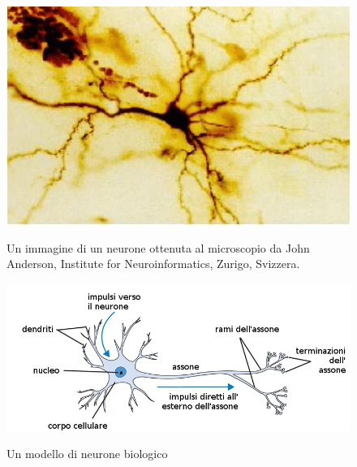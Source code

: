 \begin{figure}[h]
\centering
{\includegraphics[scale=0.65]{media_tesi/real_neuron.png}}
\caption{Un immagine di un neurone ottenuta al microscopio da John Anderson, Institute for Neuroinformatics, Zurigo, Svizzera.}
\label{fig:subfig}
\end{figure}

\vspace{1.5 cm}

\begin{figure}[h]
\centering
{\includegraphics[scale=0.55]{media_tesi/neuron_model.png}}
\caption{Un modello di neurone biologico}
\label{biologia-neuroni}
\end{figure}

%
%
%
%
%
%
%
\clearpage

